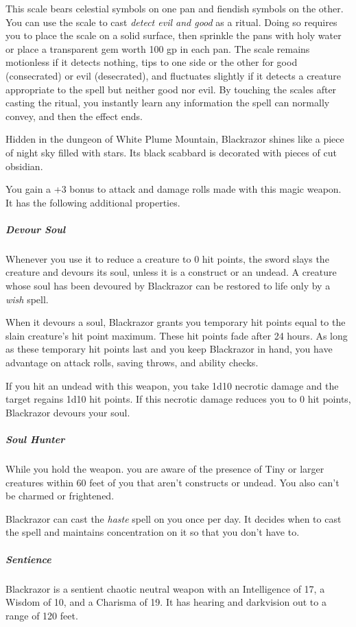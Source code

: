 \documentclass[10pt,a4paper,twoside,bg=print,twocolumn,openany,nodeprecatedcode]{dndbook}
\begin{document}
This scale bears celestial symbols on one pan and fiendish symbols on the other. You can use the scale to cast \textit{detect evil and good} as a ritual. Doing so requires you to place the scale on a solid surface, then sprinkle the pans with holy water or place a transparent gem worth 100 gp in each pan. The scale remains motionless if it detects nothing, tips to one side or the other for good (consecrated) or evil (desecrated), and fluctuates slightly if it detects a creature appropriate to the spell but neither good nor evil. By touching the scales after casting the ritual, you instantly learn any information the spell can normally convey, and then the effect ends.

Hidden in the dungeon of White Plume Mountain, Blackrazor shines like a piece of night sky filled with stars. Its black scabbard is decorated with pieces of cut obsidian.

You gain a +3 bonus to attack and damage rolls made with this magic weapon. It has the following additional properties.

\subparagraph{Devour Soul}
Whenever you use it to reduce a creature to 0 hit points, the sword slays the creature and devours its soul, unless it is a construct or an undead. A creature whose soul has been devoured by Blackrazor can be restored to life only by a \textit{wish} spell.

When it devours a soul, Blackrazor grants you temporary hit points equal to the slain creature's hit point maximum. These hit points fade after 24 hours. As long as these temporary hit points last and you keep Blackrazor in hand, you have advantage on attack rolls, saving throws, and ability checks.

If you hit an undead with this weapon, you take 1d10 necrotic damage and the target regains 1d10 hit points. If this necrotic damage reduces you to 0 hit points, Blackrazor devours your soul.

\subparagraph{Soul Hunter}
While you hold the weapon. you are aware of the presence of Tiny or larger creatures within 60 feet of you that aren't constructs or undead. You also can't be charmed or frightened.

Blackrazor can cast the \textit{haste} spell on you once per day. It decides when to cast the spell and maintains concentration on it so that you don't have to.

\subparagraph{Sentience}
Blackrazor is a sentient chaotic neutral weapon with an Intelligence of 17, a Wisdom of 10, and a Charisma of 19. It has hearing and darkvision out to a range of 120 feet.
\end{document}
